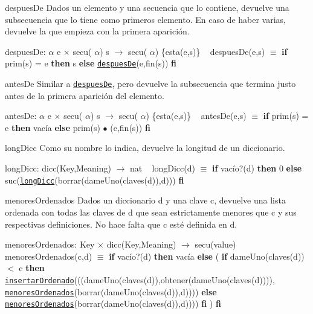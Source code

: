 \begin{DoxyParagraph}{despues\+De}
Dados un elemento y una secuencia que lo contiene, devuelve una subsecuencia que lo tiene como primeros elemento. En caso de haber varias, devuelve la que empieza con la primera aparición.

despues\+De\+:  $\alpha$ e $\times$ secu( $\alpha$) s $\to$ secu( $\alpha$) \{esta(e,s)\} ~\newline
 despues\+De(e,s) $\equiv$ {\bfseries if} prim(s) = e {\bfseries then} s {\bfseries else} \href{axiomas.html#despuesDe}{\tt despues\+De}(e,fin(s)) {\bfseries fi} 


\end{DoxyParagraph}
\begin{DoxyParagraph}{antes\+De}
Similar a \href{axiomas.html#despuesDe}{\tt despues\+De}, pero devuelve la subsecuencia que termina justo antes de la primera aparición del elemento.

antes\+De\+:  $\alpha$ e $\times$ secu( $\alpha$) s $\to$ secu( $\alpha$) \{esta(e,s)\} ~\newline
 antes\+De(e,s) $\equiv$ {\bfseries if} prim(s) = e {\bfseries then} vacía {\bfseries else} prim(s) $\bullet$ (e,fin(s)) {\bfseries fi} 


\end{DoxyParagraph}
\begin{DoxyParagraph}{long\+Dicc}
Como su nombre lo indica, devuelve la longitud de un diccionario.

long\+Dicc\+: dicc(\+Key,\+Meaning) $\to$ nat ~\newline
 long\+Dicc(d) $\equiv$ {\bfseries if} vacío?(d) {\bfseries then} 0 {\bfseries else} suc(\href{axiomas.html#longDicc}{\tt long\+Dicc}(borrar(dame\+Uno(claves(d)),d))) {\bfseries fi} 


\end{DoxyParagraph}
\begin{DoxyParagraph}{menores\+Ordenados}
Dados un diccionario d y una clave c, devuelve una lista ordenada con todas las claves de d que sean estrictamente menores que c y sus respectivas definiciones. No hace falta que c esté definida en d.

menores\+Ordenados\+: Key $\times$ dicc(\+Key,\+Meaning) $\to$ secu(value) ~\newline
 menores\+Ordenados(c,d) $\equiv$ {\bfseries if} vacío?(d) {\bfseries then} vacía {\bfseries else} ( {\bfseries if} dame\+Uno(claves(d)) $<$ c {\bfseries then} \href{axiomas.html#insertarOrdenado}{\tt insertar\+Ordenado}(((dame\+Uno(claves(d)),obtener(dame\+Uno(claves(d)))), \href{axiomas.html#menoresOrdenados}{\tt menores\+Ordenados}(borrar(dame\+Uno(claves(d)),d)))) {\bfseries else} \href{axiomas.html#menoresOrdenados}{\tt menores\+Ordenados}(borrar(dame\+Uno(claves(d)),d)))) {\bfseries fi} ) {\bfseries fi} 


\end{DoxyParagraph}
